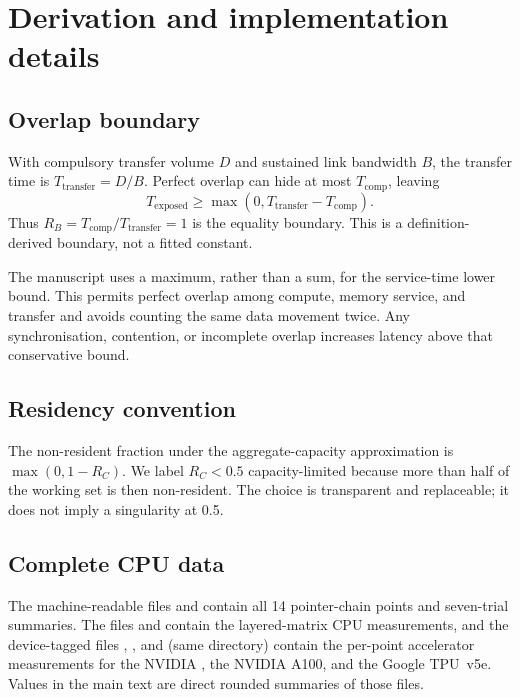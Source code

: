 \section{Derivation and implementation details}

\subsection{Overlap boundary}
With compulsory transfer volume $D$ and sustained link bandwidth $B$, the
transfer time is $T_{\mathrm{transfer}}=D/B$. Perfect overlap can hide at most
$T_{\mathrm{comp}}$, leaving
\begin{equation}
T_{\mathrm{exposed}}\geq
\max(0,T_{\mathrm{transfer}}-T_{\mathrm{comp}}).
\end{equation}
Thus $R_B=T_{\mathrm{comp}}/T_{\mathrm{transfer}}=1$ is the equality boundary.
This is a definition-derived boundary, not a fitted constant.

The manuscript uses a maximum, rather than a sum, for the service-time lower
bound. This permits perfect overlap among compute, memory service, and transfer
and avoids counting the same data movement twice. Any synchronisation,
contention, or incomplete overlap increases latency above that conservative
bound.

\subsection{Residency convention}
The non-resident fraction under the aggregate-capacity approximation is
$\max(0,1-R_C)$. We label $R_C<0.5$ capacity-limited because more than half of
the working set is then non-resident. The choice is transparent and replaceable;
it does not imply a singularity at 0.5.

\subsection{Complete CPU data}
The machine-readable files
 and
 contain all 14
pointer-chain points and seven-trial summaries. The files
 and
 contain the layered-matrix CPU measurements, and
the device-tagged files , , and
 (same directory) contain the per-point accelerator
measurements for the NVIDIA \GpuDevice{}, the NVIDIA A100, and the Google
TPU~v5e. Values in the main text are direct rounded summaries of those files.


